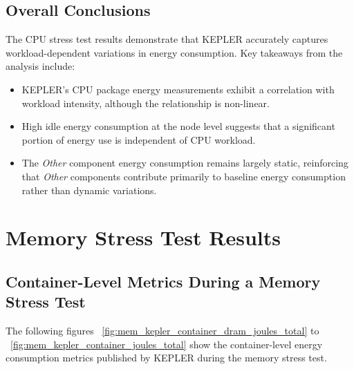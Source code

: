\subsection{Overall Conclusions}
The CPU stress test results demonstrate that KEPLER accurately captures workload-dependent variations in energy consumption. Key takeaways from the analysis include:
\begin{itemize}
    \item KEPLER's CPU package energy measurements exhibit a correlation with workload intensity, although the relationship is non-linear.
    \item High idle energy consumption at the node level suggests that a significant portion of energy use is independent of CPU workload.
    \item The \textit{Other} component energy consumption remains largely static, reinforcing that \textit{Other} components contribute primarily to baseline energy consumption rather than dynamic variations.
\end{itemize}

\section{Memory Stress Test Results}

\subsection{Container-Level Metrics During a Memory Stress Test}

The following figures ~\ref{fig:mem_kepler_container_dram_joules_total} to ~\ref{fig:mem_kepler_container_joules_total} show the container-level energy consumption metrics published by KEPLER during the memory stress test.

